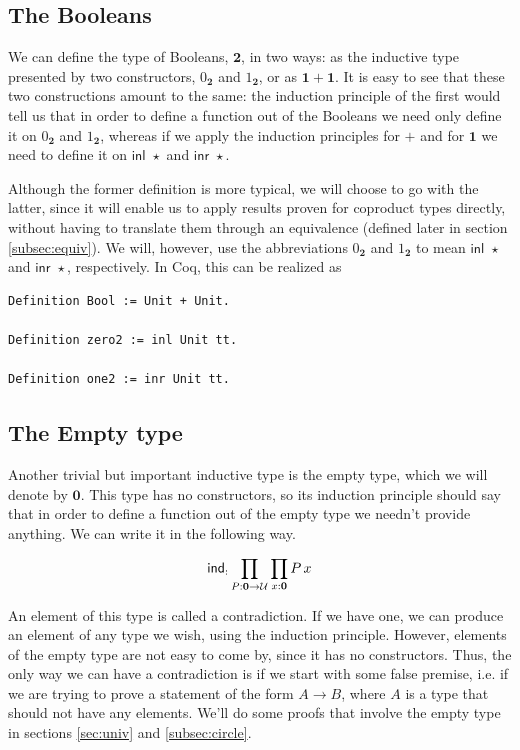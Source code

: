 \documentclass[12 pt]{amsart}
\theoremstyle{definition}
\theoremstyle{remark}
\newcommand{\inl}{\mathsf{inl}\,}
\newcommand{\inr}{\mathsf{inr}\,}
\newcommand{\Type}{\mathcal{U}}
\newcommand{\bool}{{\mathbf{2}}}
\newcommand{\boolone}{1_\bool}
\newcommand{\boolzero}{0_\bool}
\newcommand{\zero}{{\mathbf{0}}}
\newcommand{\one}{{\mathbf{1}}}
\newcommand{\ind}{\mathsf{ind}}
\begin{document}
\subsection{The Booleans}
We can define the type of Booleans, $\bool$, in two ways: as the inductive type presented by two constructors, $\boolzero$ and $\boolone$, or as $\one + \one$. It is easy to see that these two constructions amount to the same: the induction principle of the first would tell us that in order to define a function out of the Booleans we need only define it on $\boolzero$ and $\boolone$, whereas if we apply the induction principles for $+$ and for $\one$ we need to define it on $\inl\,\star$ and $\inr\,\star$.

Although the former definition is more typical, we will choose to go with the latter, since it will enable us to apply results proven for coproduct types directly, without having to translate them through an equivalence (defined later in section \ref{subsec:equiv}). We will, however, use the abbreviations $\boolzero$ and $\boolone$ to mean $\inl\,\star$ and $\inr\,\star$, respectively. In Coq, this can be realized as

\begin{lstlisting}
Definition Bool := Unit + Unit.

Definition zero2 := inl Unit tt.

Definition one2 := inr Unit tt.

\end{lstlisting}



\subsection{The Empty type}

Another trivial but important inductive type is the empty type, which we will denote by $\zero$. This type has no constructors, so its induction principle should say that in order to define a function out of the empty type we needn't provide anything. We can write it in the following way.

\[\ind_\empty : \prod_{P : \zero \to \Type} \prod_{x : \zero} P\,x\]

An element of this type is called a contradiction. If we have one, we can produce an element of any type we wish, using the induction principle. However, elements of the empty type are not easy to come by, since it has no constructors. Thus, the only way we can have a contradiction is if we start with some false premise, i.e. if we are trying to prove a statement of the form $A\to B$, where $A$ is a type that should not have any elements. We'll do some proofs that involve the empty type in sections \ref{sec:univ} and \ref{subsec:circle}.
\end{document}
